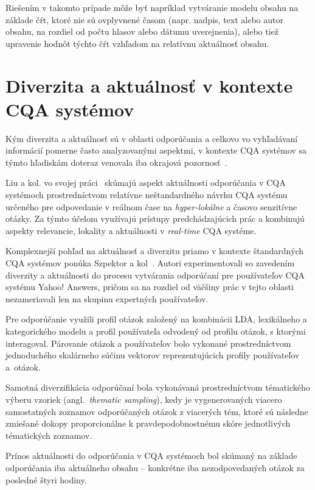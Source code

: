 Riešením v takomto prípade môže byť napríklad vytváranie modelu
obsahu na základe čŕt, ktoré nie sú ovplyvnené časom (napr. nadpis, text alebo autor obsahu, na rozdiel od počtu hlasov
alebo dátumu uverejnenia), alebo tiež upravenie hodnôt týchto čŕt vzhľadom na relatívnu aktuálnosť obsahu.


\section{Diverzita a aktuálnosť v kontexte CQA systémov}

Kým diverzita a aktuálnosť sú v oblasti odporúčania a celkovo vo vyhľadávaní informácií pomerne často analyzovanými aspektmi,
v kontexte CQA systémov sa týmto hľadiskám doteraz venovala iba okrajová pozornosť~\cite{Srba2016}.

Liu a kol. vo svojej práci~\cite{Liu2015} skúmajú aspekt aktuálnosti odporúčania v CQA systémoch prostredníctvom
relatívne neštandardného návrhu CQA systému určeného pre odpovedanie v reálnom čase na \emph{hyper-lokálne} a časovo senzitívne
otázky. Za týmto účelom využívajú prístupy predchádzajúcich prác a kombinujú aspekty relevancie, lokality a aktuálnosti
v \emph{real-time} CQA systéme.


Komplexnejší pohľad na aktuálnosť a diverzitu priamo v kontexte štandardných CQA systémov ponúka Szpektor a kol~\cite{Szpektor2013}.
Autori experimentovali so zavedením diverzity a aktuálnosti do procesu vytvárania odporúčaní pre používateľov CQA
systému Yahoo! Answers, pričom sa na rozdiel od väčšiny prác v tejto oblasti nezameriavali len na skupinu expertných používateľov.

Pre odporúčanie využili profil otázok založený na kombinácii LDA, lexikálneho a kategorického modelu a profil používateľa
odvodený od profilu otázok, s ktorými interagoval. Párovanie otázok a používateľov bolo vykonané prostredníctvom jednoduchého
skalárneho súčinu vektorov reprezentujúcich profily používateľov a~otázok.

Samotná diverzifikácia odporúčaní bola vykonávaná prostredníctvom tématického výberu vzoriek (angl.~\emph{thematic sampling}),
kedy je vygenerovaných viacero samostatných zoznamov odporúčaných otázok z viacerých tém, ktoré sú následne zmiešané dokopy
proporcionálne k pravdepodobnostnému skóre jednotlivých tématických zoznamov.

Prínos aktuálnosti do odporúčania v CQA systémoch bol skúmaný na základe odporúčania iba aktuálneho obsahu -- konkrétne
iba nezodpovedaných otázok za posledné štyri hodiny.

